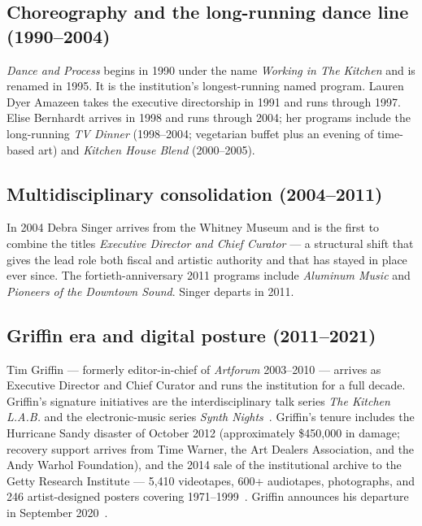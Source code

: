 \documentclass[10pt,letterpaper,twocolumn]{article}
\begin{document}
\subsection{Choreography and the long-running dance line (1990--2004)}

\emph{Dance and Process} begins in 1990 under the name \emph{Working in The Kitchen} and is renamed in 1995. It is the institution's longest-running named program. Lauren Dyer Amazeen takes the executive directorship in 1991 and runs through 1997. Elise Bernhardt arrives in 1998 and runs through 2004; her programs include the long-running \emph{TV Dinner} (1998--2004; vegetarian buffet plus an evening of time-based art) and \emph{Kitchen House Blend} (2000--2005).

\subsection{Multidisciplinary consolidation (2004--2011)}

In 2004 Debra Singer arrives from the Whitney Museum and is the first to combine the titles \emph{Executive Director and Chief Curator} --- a structural shift that gives the lead role both fiscal and artistic authority and that has stayed in place ever since. The fortieth-anniversary 2011 programs include \emph{Aluminum Music} and \emph{Pioneers of the Downtown Sound}. Singer departs in 2011.

\subsection{Griffin era and digital posture (2011--2021)}

Tim Griffin --- formerly editor-in-chief of \emph{Artforum} 2003--2010 --- arrives as Executive Director and Chief Curator and runs the institution for a full decade. Griffin's signature initiatives are the interdisciplinary talk series \emph{The Kitchen L.A.B.} and the electronic-music series \emph{Synth Nights}~\citep{wikipedia_kitchen}. Griffin's tenure includes the Hurricane Sandy disaster of October 2012 (approximately \$450{,}000 in damage; recovery support arrives from Time Warner, the Art Dealers Association, and the Andy Warhol Foundation), and the 2014 sale of the institutional archive to the Getty Research Institute --- 5{,}410 videotapes, 600+ audiotapes, photographs, and 246 artist-designed posters covering 1971--1999~\citep{getty_kitchen_archive}. Griffin announces his departure in September 2020~\citep{artforum_griffin_depart}.
\end{document}
